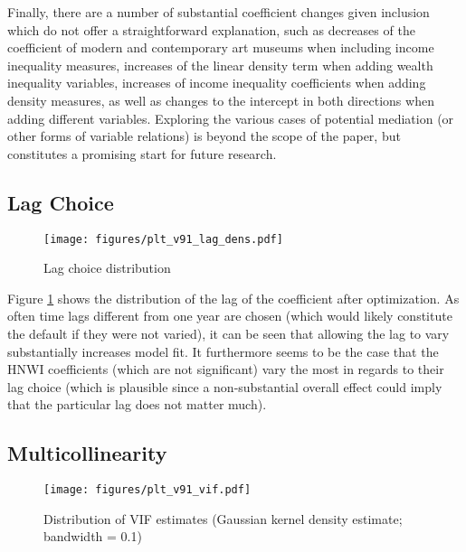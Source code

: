 \documentclass[11pt]{article}
\begin{document}
Finally, there are a number of substantial coefficient changes given inclusion which do not offer a straightforward explanation, such as decreases of the coefficient of modern and contemporary art museums when including income inequality measures, increases of the linear density term when adding wealth inequality variables, increases of income inequality coefficients when adding density measures, as well as changes to the intercept in both directions when adding different variables. 
Exploring the various cases of potential mediation (or other forms of variable relations) is beyond the scope of the paper, but constitutes a promising start for future research.






\subsection{Lag Choice}
\label{app_lagchoice}
\begin{figure}[htbp]
\centering
\texttt{[image: figures/plt\_v91\_lag\_dens.pdf]}
\caption{\label{fig:lag_dens}Lag choice distribution}
\end{figure}

Figure \ref{fig:lag_dens} shows the distribution of the lag of the coefficient after optimization.
As often time lags different from one year are chosen (which would likely constitute the default if they were not varied), it can be seen that allowing the lag to vary substantially increases model fit. 
It furthermore seems to be the case that the HNWI coefficients (which are not significant) vary the most in regards to their lag choice (which is plausible since a non-substantial overall effect could imply that the particular lag does not matter much). 




\subsection{Multicollinearity}
\label{app_vif}
\begin{figure}[htbp]
\centering
\texttt{[image: figures/plt\_v91\_vif.pdf]}
\caption{\label{fig:vif}Distribution of VIF estimates (Gaussian kernel density estimate; bandwidth = 0.1)}
\end{figure}
\end{document}
